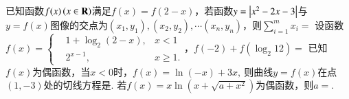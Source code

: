 \documentclass{BHCexam}
\begin{document}
\begin{questions}
  	\qs 已知函数$f(x)\left(x\in\mathbf{R}\right)$满足$ f(x)=f(2-x) $，若函数$ y=\left|x^2-2x-3\right| $与$ y=f(x) $图像的交点为$ \left(x_1,y_1\right),\left(x_2,y_2\right) ,\cdots\left(x_n,y_n\right)$，则$ \sum\limits_{i=1}^m x_i=$\xx
  	\qs 设函数$f(x)=\left\{\begin{aligned}
  	&1+\log_2\left({2-x}\right),&x<1\\
  	&2^{x-1},&x\ge1.
  	\end{aligned}\right.$，$ f(-2)+f\left(\log_2{12}\right)= $\xx
  	\qs 已知$f(x)$为偶函数，当$ x<0 $时，$f(x)=\ln (-x)+3x,~$则曲线$ y=f(x) $在点$ \left(1,-3\right) $处的切线方程是\tk.
  	\qs 若$f(x)=x\ln (x+\sqrt{a+x^2})$为偶函数，则$ a= $\tk.
\end{questions}
\end{document}
